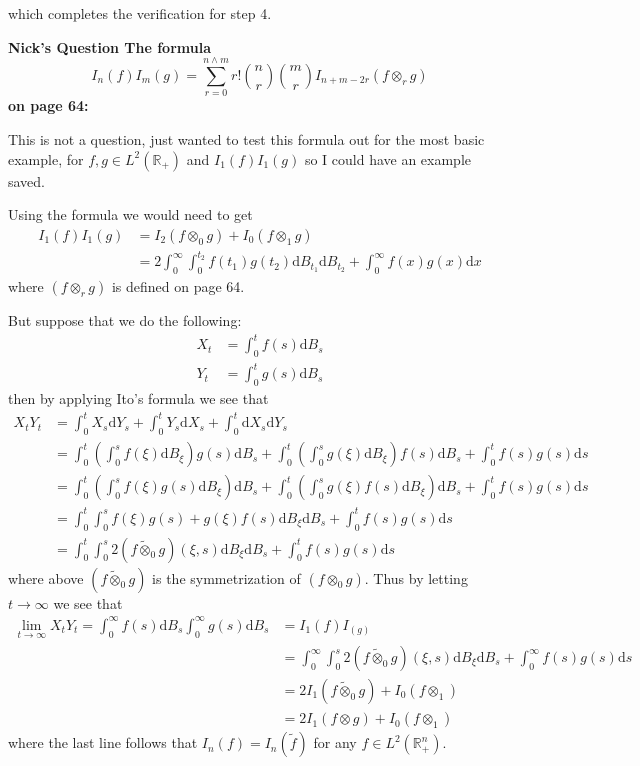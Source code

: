 \documentclass[a4paper,11pt]{article}
\numberwithin{equation}{section}
\theoremstyle{plain}
\theoremstyle{definition}
\newcommand{\ud}{\ensuremath{\mathrm{d}}}
\newcommand{\R}{\mathbb{R}}
\newcounter{NQ}
\newenvironment{NickQuestion}[1][] %
{\refstepcounter{NQ}
	\begin{mdframed}[backgroundcolor=lightgray]\textbf{Nick's Question \theNQ \: #1~~}~~~\noindent}%
	{\end{mdframed}}
\numberwithin{NQ}{section}
\numberwithin{LQ}{section}
\numberwithin{ZQ}{section}
\begin{document}
which completes the verification for step 4. 
\begin{NickQuestion}[The formula  $$I_n(f)I_m(g) = \sum_{r=0}^{n \wedge m}r! {n \choose r}{m \choose r}I_{n+m -2r}(f \otimes_r g)$$ on page 64:] $\;$
	
	This is not a question, just wanted to test this formula out for the most basic example, for $f,g \in L^2(\R_+)$ and $I_1(f)I_1(g)$ so I could have an example saved. 
	
	Using the formula we would need to get 
	\begin{align}
	I_1(f)I_1(g) &= I_2(f\otimes_0 g)+ I_0(f \otimes_1 g) \label{eqn}
	\\&= 2\int_0^\infty \int_0^{t_2}f(t_1)g(t_2)\ud B_{t_1}\ud B_{t_2} +  \int_0^\infty f(x)g(x) \ud x
	\end{align}
	where $(f \otimes_r g)$ is defined on page 64. 
	
	But suppose that we do the following:
	\begin{align*}
		X_t &= \int_0^t f(s) \ud B_s
		\\ Y_t &= \int _0^t g(s) \ud B_s
	\end{align*}
	then by applying Ito's formula we see that 
	\begin{align*}
	X_tY_t  &= \int_0^t X_s \ud Y_s + \int_0^t Y_s \ud X_s + \int_0^t \ud X_s \ud Y_s 
	\\& = \int_0^t \left(\int_0^s f(\xi) \ud B_{\xi}\right)g(s) \ud B_s + \int_0^t \left(\int_0^s g(\xi) \ud B_{\xi}\right)f(s) \ud B_s + \int_0^t f(s)g(s) \ud s
	\\& = \int_0^t \left(\int_0^s f(\xi)g(s)\ud B_{\xi}\right) \ud B_s + \int_0^t \left(\int_0^s g(\xi)f(s) \ud B_{\xi}\right) \ud B_s + \int_0^t f(s)g(s) \ud s
	\\& = \int_0^t \int_0^s f(\xi)g(s)+g(\xi)f(s) \ud B_{\xi} \ud B_s  + \int_0^t f(s)g(s) \ud s
	\\& = \int_0^t \int_0^s 2(f \tilde{\otimes}_0 g)(\xi,s)\ud B_{\xi} \ud B_s  + \int_0^t f(s)g(s) \ud s
	\end{align*}
	where above $(f \tilde{\otimes}_0 g)$ is the symmetrization of $(f \otimes_0 g)$. Thus by letting $t \to \infty$ we see that 
	\begin{align}
	\lim_{t\to \infty} 	X_tY_t = \int_0^\infty f(s) \ud B_s \int_0^\infty g(s) \ud B_s &= I_1(f)I_(g) \nonumber
	\\& = \int_0^\infty \int_0^s 2(f \tilde{\otimes}_0 g)(\xi,s)\ud B_{\xi} \ud B_s  + \int_0^\infty f(s)g(s) \ud s \nonumber
	\\&  = 2I_1(f \tilde{\otimes}_0 g) + I_0(f \otimes_1) \nonumber
	\\& = 2I_1(f \otimes g) + I_0(f \otimes_1) \label {cont}
	\end{align}
	where the last line follows that $I_n(f) = I_n(\tilde{f})$ for any $f \in L^2(\R_+^n)$. 
\end{NickQuestion}
\end{document}
